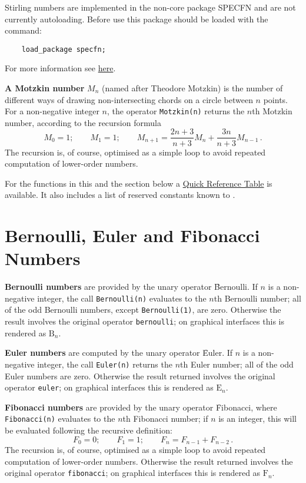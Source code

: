 Stirling numbers are implemented in the non-core package SPECFN and are
not currently autoloading. Before use this package should be loaded with the
command:
\begin{verbatim}
    load_package specfn;
\end{verbatim}
For more information see \hyperlink{STIRL}{here}.

\hypertarget{operator:MOTZKIN}{}
\textbf{A Motzkin number} $M_{n}$ (named after Theodore Motzkin) is the
number of different ways of drawing non-intersecting chords on a circle between
$n$ points. For a non-negative integer $n$, the operator \texttt{Motzkin(n)}
returns the $n$th Motzkin number, according to the recursion formula
\begin{displaymath}
  M_{0} = 1; \qquad M_{1}=1; \qquad
  M_{n+1} = \frac{2n+3}{n+3}M_{n}+ \frac{3n}{n+3}M_{n-1}\,.
\end{displaymath}
The recursion is, of course, optimised as a simple loop to avoid repeated
computation of lower-order numbers.

For the functions in this and the section below
a \hyperlink{SPECFNTAB5}{Quick Reference Table} is available.
It also includes a list of reserved constants known to {\REDUCE}.

\section{Bernoulli, Euler and Fibonacci Numbers}
\hypertarget{operator:BERNOULLI}{}
\textbf{Bernoulli numbers} are provided by the unary operator
\f{Bernoulli}. If $n$ is a non-negative integer, the call \texttt{Bernoulli(n)}
evaluates to the $n$th Bernoulli number; all of the odd Bernoulli numbers,
except \texttt{Bernoulli(1)}, are zero. Otherwise the result involves the
original operator \texttt{bernoulli}; on graphical interfaces this is rendered
as $\mathrm{B}_n$.

\hypertarget{operator:EULER}{}
\textbf{Euler numbers} are computed by the unary operator \f{Euler}.  If $n$
is a non-negative integer, the call \texttt{Euler(n)} returns the $n$th
Euler number; all of the odd Euler numbers are zero.
Otherwise the result returned involves the original operator \texttt{euler};
on graphical interfaces this is rendered
as $\mathrm{E}_n$.

\hypertarget{operator:FIBONACCI}{}
\textbf{Fibonacci numbers} are provided by the unary operator \f{Fibonacci},
where \texttt{Fibonacci(n)} evaluates to the $n$th Fibonacci
number; if $n$ is an integer, this will be evaluated following
the recursive definition:
$$F_0 = 0; \qquad F_1 = 1;\qquad F_n = F_{n-1} + F_{n-2}\,.$$
The recursion is, of course, optimised as a simple loop to avoid repeated
computation of lower-order numbers.
Otherwise the result returned involves the original operator
\texttt{fibonacci}; on graphical interfaces this is rendered
as $\mathrm{F}_n$.

